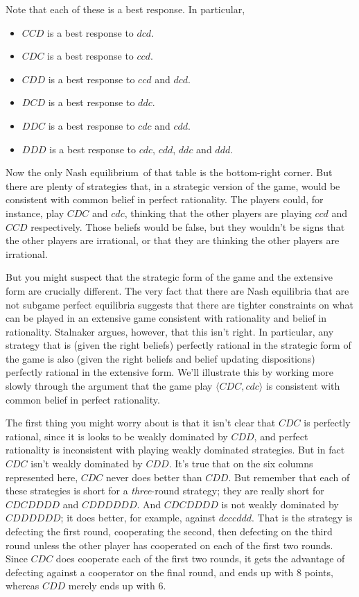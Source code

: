\documentclass[
  11pt,
  letterpaper,
]{scrbook}
\providecommand{\tightlist}{%
  \setlength{\itemsep}{0pt}\setlength{\parskip}{0pt}}
\begin{document}
Note that each of these is a best response. In particular,

\begin{itemize}
\tightlist
\item
  \(CCD\) is a best response to \(dcd\).
\item
  \(CDC\) is a best response to \(ccd\).
\item
  \(CDD\) is a best response to \(ccd\) and \(dcd\).
\item
  \(DCD\) is a best response to \(ddc\).
\item
  \(DDC\) is a best response to \(cdc\) and \(cdd\).
\item
  \(DDD\) is a best response to \(cdc\), \(cdd\), \(ddc\) and \(ddd\).
\end{itemize}

Now the only Nash equilibrium~of that table is the bottom-right corner.
But there are plenty of strategies that, in a strategic version of the
game, would be consistent with common belief in perfect rationality. The
players could, for instance, play \(CDC\) and \(cdc\), thinking that the
other players are playing \(ccd\) and \(CCD\) respectively. Those
beliefs would be false, but they wouldn't be signs that the other
players are irrational, or that they are thinking the other players are
irrational.

But you might suspect that the strategic form of the game and the
extensive form are crucially different. The very fact that there are
Nash equilibria that are not subgame perfect equilibria suggests that
there are tighter constraints on what can be played in an extensive game
consistent with rationality and belief in rationality. Stalnaker argues,
however, that this isn't right. In particular, any strategy that is
(given the right beliefs) perfectly rational in the strategic form of
the game is also (given the right beliefs and belief updating
dispositions) perfectly rational in the extensive form. We'll illustrate
this by working more slowly through the argument that the game play
\(\langle CDC, cdc \rangle\) is consistent with common belief in perfect
rationality.

The first thing you might worry about is that it isn't clear that
\(CDC\) is perfectly rational, since it is looks to be weakly dominated
by \(CDD\), and perfect rationality is inconsistent with playing weakly
dominated strategies. But in fact \(CDC\) isn't weakly dominated by
\(CDD\). It's true that on the six columns represented here, \(CDC\)
never does better than \(CDD\). But remember that each of these
strategies is short for a \emph{three}-round strategy; they are really
short for \(CDCDDDD\) and \(CDDDDDD\). And \(CDCDDDD\) is not weakly
dominated by \(CDDDDDD\); it does better, for example, against
\(dcccddd\). That is the strategy is defecting the first round,
cooperating the second, then defecting on the third round unless the
other player has cooperated on each of the first two rounds. Since
\(CDC\) does cooperate each of the first two rounds, it gets the
advantage of defecting against a cooperator on the final round, and ends
up with 8 points, whereas \(CDD\) merely ends up with 6.
\end{document}
